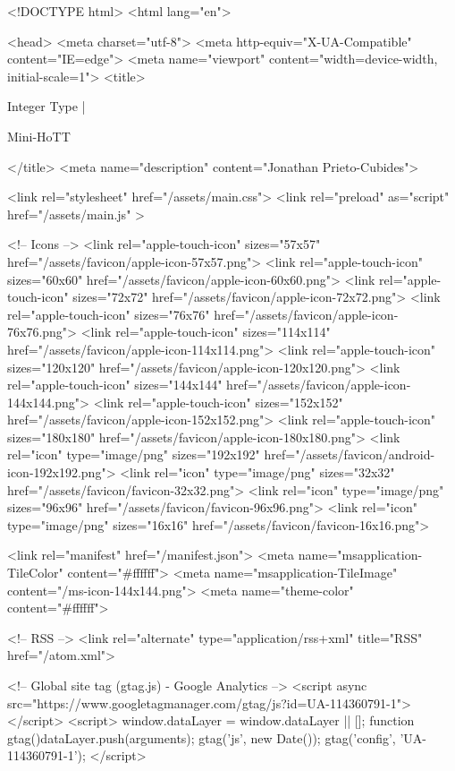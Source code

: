 <!DOCTYPE html>
<html lang="en">

<head>
  <meta charset="utf-8">
  <meta http-equiv="X-UA-Compatible" content="IE=edge">
  <meta name="viewport" content="width=device-width, initial-scale=1">
  <title>
    
      
        Integer Type |
      
        Mini-HoTT
    
  </title>
  <meta name="description" content="Jonathan Prieto-Cubides">

  <link rel="stylesheet" href="/assets/main.css">
  <link rel="preload" as="script" href="/assets/main.js" >

  <!-- Icons -->
  <link rel="apple-touch-icon" sizes="57x57" href="/assets/favicon/apple-icon-57x57.png">
  <link rel="apple-touch-icon" sizes="60x60" href="/assets/favicon/apple-icon-60x60.png">
  <link rel="apple-touch-icon" sizes="72x72" href="/assets/favicon/apple-icon-72x72.png">
  <link rel="apple-touch-icon" sizes="76x76" href="/assets/favicon/apple-icon-76x76.png">
  <link rel="apple-touch-icon" sizes="114x114" href="/assets/favicon/apple-icon-114x114.png">
  <link rel="apple-touch-icon" sizes="120x120" href="/assets/favicon/apple-icon-120x120.png">
  <link rel="apple-touch-icon" sizes="144x144" href="/assets/favicon/apple-icon-144x144.png">
  <link rel="apple-touch-icon" sizes="152x152" href="/assets/favicon/apple-icon-152x152.png">
  <link rel="apple-touch-icon" sizes="180x180" href="/assets/favicon/apple-icon-180x180.png">
  <link rel="icon" type="image/png" sizes="192x192"  href="/assets/favicon/android-icon-192x192.png">
  <link rel="icon" type="image/png" sizes="32x32" href="/assets/favicon/favicon-32x32.png">
  <link rel="icon" type="image/png" sizes="96x96" href="/assets/favicon/favicon-96x96.png">
  <link rel="icon" type="image/png" sizes="16x16" href="/assets/favicon/favicon-16x16.png">

  <link rel="manifest" href="/manifest.json">
  <meta name="msapplication-TileColor" content="#ffffff">
  <meta name="msapplication-TileImage" content="/ms-icon-144x144.png">
  <meta name="theme-color" content="#ffffff">

  <!-- RSS -->
  <link rel="alternate" type="application/rss+xml" title="RSS" href="/atom.xml">

  <!-- Global site tag (gtag.js) - Google Analytics -->
  <script async src="https://www.googletagmanager.com/gtag/js?id=UA-114360791-1"></script>
  <script>
    window.dataLayer = window.dataLayer || [];
    function gtag(){dataLayer.push(arguments);}
    gtag('js', new Date());
    gtag('config', 'UA-114360791-1');
  </script>

